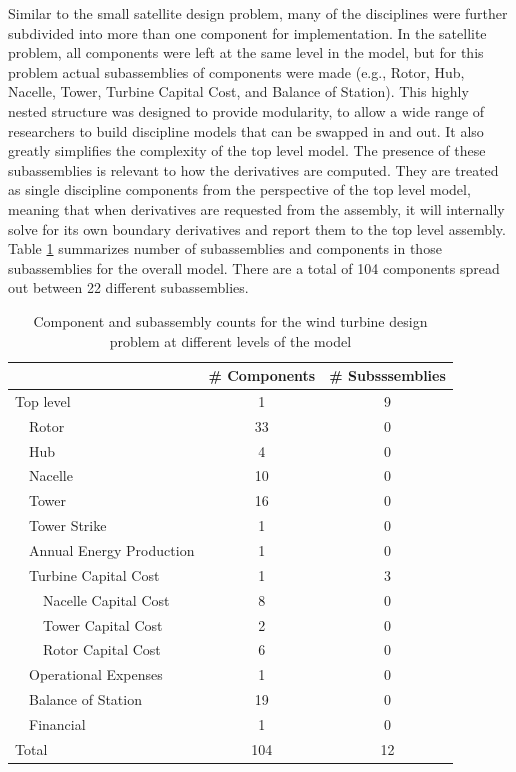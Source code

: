 \documentclass[]{aiaa-tc} %
\begin{document}
    Similar to the small satellite design problem, many of the disciplines were further
    subdivided into more than one component for implementation. In the
    satellite problem, all components were left at the same level in the model, but for this problem
    actual subassemblies of components were made (e.g., Rotor, Hub, Nacelle, Tower, Turbine Capital Cost,
    and Balance of Station). This highly nested structure was designed to provide modularity,
    to allow a wide range of researchers to build discipline models that can be swapped in and out.
    It also greatly simplifies the complexity of the top level model.
    The presence of these subassemblies is relevant to how the derivatives are computed.
    They are treated as single discipline components from the perspective of the top level model,
    meaning that when derivatives are requested from the assembly, it will internally solve
    for its own boundary derivatives and report them to the top level assembly. Table \ref{tab:wt_comp_counts}
    summarizes number of subassemblies and components in those subassemblies for the overall model. There 
    are a total of 104 components spread out between 22 different subassemblies. 

    \begin{table}\centering
      \caption{Component and subassembly counts for the wind turbine design problem at different levels of 
      the model}
      \label{tab:wt_comp_counts}
      \begin{tabular}{l c c}
      \toprule
             & \# Components & \# Subsssemblies \\
      \midrule
      Top level & 1 & 9\\
      \ \  Rotor & 33 & 0\\
      \ \  Hub & 4 & 0\\
      \ \  Nacelle & 10 & 0 \\
      \ \  Tower & 16 & 0\\
      \ \ Tower Strike & 1 & 0 \\
      \ \  Annual Energy Production & 1 & 0 \\
      \ \  Turbine Capital Cost & 1 & 3  \\
      \ \ \ \ Nacelle Capital Cost & 8 & 0  \\
      \ \ \ \ Tower Capital Cost & 2 & 0 \\
      \ \ \ \ Rotor Capital Cost & 6 & 0  \\
      \ \  Operational Expenses & 1 & 0  \\
      \ \  Balance of Station & 19 & 0 \\
      \ \  Financial & 1 & 0 \\ 
      \hline
      Total & 104 & 12 \\

      \bottomrule
      \end{tabular}
    \end{table}
\end{document}
